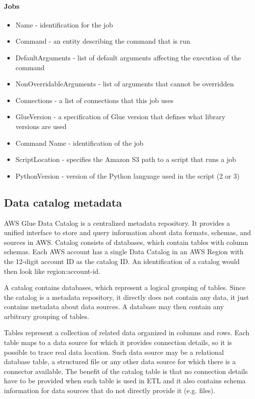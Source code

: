\paragraph{Jobs}
\begin{itemize}
    \item Name - identification for the job
    \item Command - an entity describing the command that is run
    \item DefaultArguments - list of default arguments affecting the execution of the command
    \item NonOverridableArguments - list of arguments that cannot be overridden
    \item Connections - a list of connections that this job uses
    \item GlueVersion - a specification of Glue version that defines what library versions are used
    \item Command Name - identification of the job
    \item ScriptLocation - specifies the Amazon S3 path to a script that runs a job
    \item PythonVersion - version of the Python language used in the script (2 or 3)
\end{itemize}

\subsection{Data catalog metadata}

AWS Glue Data Catalog is a centralized metadata repository. It provides a unified interface to store and query information about data formats, schemas, and sources in AWS. Catalog consists of databases, which contain tables with column schemas. Each AWS account has a single Data Catalog in an AWS Region with the 12-digit account ID as the catalog ID. An identification of a catalog would then look like region:account-id.

A catalog contains databases, which represent a logical grouping of tables. Since the catalog is a metadata repository, it directly does not contain any data, it just contains metadata about data sources. A database may then contain any arbitrary grouping of tables.

Tables represent a collection of related data organized in columns and rows. Each table maps to a data source for which it provides connection details, so it is possible to trace real data location. Such data source may be a relational database table, a structured file or any other data source for which there is a connector available. The benefit of the catalog table is that no connection details have to be provided when such table is used in ETL and it also contains schema information for data sources that do not directly provide it (e.g. files).


